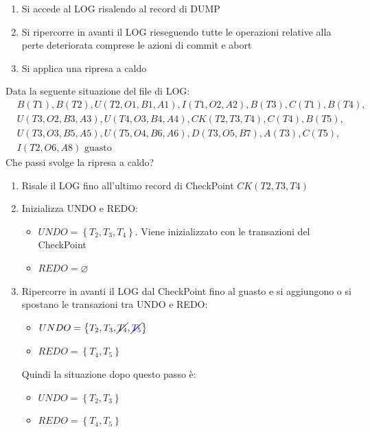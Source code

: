 \documentclass[a4paper]{article}
\begin{document}
\begin{itemize}
\begin{enumerate}
      \item Si accede al LOG risalendo al record di DUMP

      \item Si ripercorre in avanti il LOG rieseguendo tutte le operazioni relative
        alla perte deteriorata comprese le azioni di commit e abort

      \item Si applica una ripresa a caldo
    \end{enumerate}
\end{itemize}

\begin{exercise}
  Data la seguente situazione del file di LOG:
  \[
    \begin{aligned}
      & B(T1), B(T2), U(T2,O1,B1,A1), I(T1,O2,A2), B(T3), C(T1), B(T4), \\
      &U(T3,O2,B3,A3), U(T4,O3,B4,A4), CK(T2,T3,T4), C(T4), B(T5), \\
      & U(T3,O3,B5,A5), U(T5,O4,B6,A6), D(T3,O5,B7), A(T3), C(T5), \\
      &I(T2,O6,A8) \text{ guasto}
    \end{aligned}
  \] 
  Che passi svolge la ripresa a caldo?

  \begin{enumerate}
    \item Risale il LOG fino all'ultimo record di CheckPoint \( CK(T2,T3,T4) \)

    \item Inizializza UNDO e REDO:
      \begin{itemize}
        \item \( UNDO = \left\{ T_2, T_3, T_4 \right\} \). Viene inizializzato con le
          transazioni del CheckPoint
        \item \( REDO = \varnothing \)
      \end{itemize}

    \item Ripercorre in avanti il LOG dal CheckPoint fino al guasto e si aggiungono
      o si spostano le transazioni tra UNDO e REDO:
      \begin{itemize}
        \item \( UNDO = \left\{ T_2, T_3, \cancel{T_4}, \cancel{\color{blue}T_5\color{black}} \right\}  \) 
        \item \( REDO = \left\{ T_4, T_5 \right\}  \) 
      \end{itemize}
      Quindi la situazione dopo questo passo è:
      \begin{itemize}
        \item \( UNDO = \left\{ T_2, T_3 \right\}  \)
        \item \( REDO = \left\{ T_4, T_5 \right\}  \)
      \end{itemize}


\end{enumerate}
\end{exercise}
\end{document}
